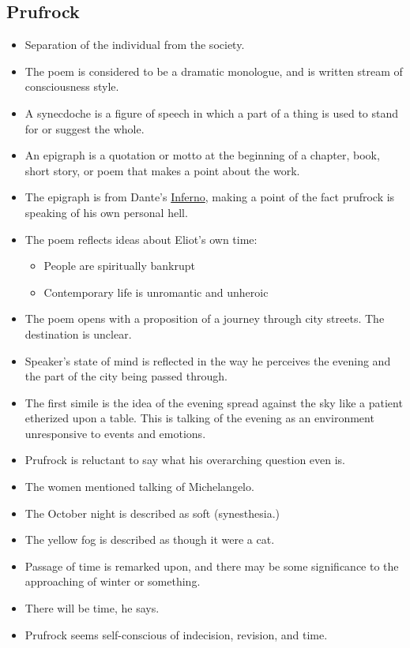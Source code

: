 \documentclass[11pt]{article}
\begin{document}
\subsection{Prufrock}
\begin{itemize}
	\item Separation of the individual from the society.
	\item The poem is considered to be a dramatic monologue, and is written stream
		of consciousness style.
	\item A synecdoche is a figure of speech in which a part of a thing is used to
		stand for or suggest the whole.
	\item An epigraph is a quotation or motto at the beginning of a chapter, book, 
		short story, or poem that makes a point about the work.
	\item The epigraph is from Dante's \underline{Inferno}, making a point of the
		fact prufrock is speaking of his own personal hell.
	\item The poem reflects ideas about Eliot's own time:
	\begin{itemize}
		\item People are spiritually bankrupt
		\item Contemporary life is unromantic and unheroic
	\end{itemize}
	\item The poem opens with a proposition of a journey through city streets.
		The destination is unclear.
	\item Speaker's state of mind is reflected in the way he perceives the evening 
		and the part of the city being passed through.
	\item The first simile is the idea of the evening spread against the sky like
		a patient etherized upon a table.  This is talking of the evening as an 
		environment unresponsive to events and emotions.
	\item Prufrock is reluctant to say what his overarching question even is.
	\item The women mentioned talking of Michelangelo.
	\item The October night is described as soft (synesthesia.)
	\item The yellow fog is described as though it were a cat.
	\item Passage of time is remarked upon, and there may be some significance to
		the approaching of winter or something.
	\item There will be time, he says.
	\item Prufrock seems self-conscious of indecision, revision, and time.

\end{itemize}
\end{document}
